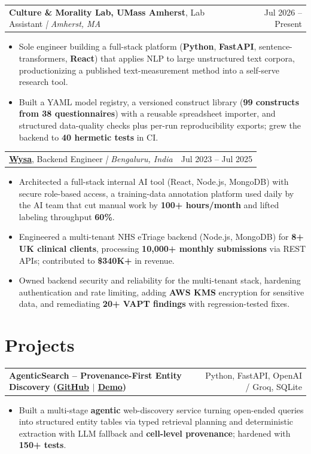 \documentclass[letterpaper,11pt]{article}
\makeatletter
\newcommand{\expItem}[4]{%
  \vspace{2pt}
  \begin{tabular*}{\textwidth}{@{}l@{\extracolsep{\fill}}r@{}}
    \textbf{#1}, #2 \textit{| #3} & #4 \\
  \end{tabular*}\par\vspace{-3pt}
}
\newcommand{\projItem}[2]{%
  \vspace{2pt}
  \begin{tabular*}{\textwidth}{@{}l@{\extracolsep{\fill}}r@{}}
    \textbf{#1} & #2 \\
  \end{tabular*}\par\vspace{-3pt}
}
\makeatother
\begin{document}
\expItem{Culture \& Morality Lab, UMass Amherst}{Lab Assistant}{Amherst, MA}{Jul 2026 -- Present}
\begin{itemize}
  \item Sole engineer building a full-stack platform (\textbf{Python}, \textbf{FastAPI}, sentence-transformers, \textbf{React}) that applies NLP to large unstructured text corpora, productionizing a published text-measurement method into a self-serve research tool.
  \item Built a YAML model registry, a versioned construct library (\textbf{99 constructs from 38 questionnaires}) with a reusable spreadsheet importer, and structured data-quality checks plus per-run reproducibility exports; grew the backend to \textbf{40 hermetic tests} in CI.
\end{itemize}

\expItem{\href{https://www.wysa.io}{Wysa}}{Backend Engineer}{Bengaluru, India}{Jul 2023 -- Jul 2025}
\begin{itemize}
  \item Architected a full-stack internal AI tool (React, Node.js, MongoDB) with secure role-based access, a training-data annotation platform used daily by the AI team that cut manual work by \textbf{100+ hours/month} and lifted labeling throughput \textbf{60\%}.
  \item Engineered a multi-tenant NHS eTriage backend (Node.js, MongoDB) for \textbf{8+ UK clinical clients}, processing \textbf{10{,}000+ monthly submissions} via REST APIs; contributed to \textbf{\$340K+} in revenue.
  \item Owned backend security and reliability for the multi-tenant stack, hardening authentication and rate limiting, adding \textbf{AWS KMS} encryption for sensitive data, and remediating \textbf{20+ VAPT findings} with regression-tested fixes.
\end{itemize}

\section{Projects}

\projItem{AgenticSearch -- Provenance-First Entity Discovery {\normalfont\small(\href{https://github.com/Deva-1903/ciir_agentic_search}{GitHub} $\vert$ \href{https://agentic-search-negglszkwa-uc.a.run.app}{Demo})}}{Python, FastAPI, OpenAI / Groq, SQLite}
\begin{itemize}
  \item Built a multi-stage \textbf{agentic} web-discovery service turning open-ended queries into structured entity tables via typed retrieval planning and deterministic extraction with LLM fallback and \textbf{cell-level provenance}; hardened with \textbf{150+ tests}.
\end{itemize}
\end{document}
